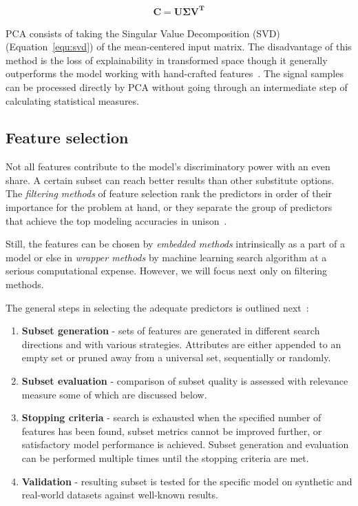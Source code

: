 \begin{ceqn}\begin{align}
\mathbf{C} = \mathbf{U \Sigma V^T}
\label{equ:svd}
\end{align}\end{ceqn}

PCA consists of taking the Singular Value Decomposition (SVD) (Equation~\ref{equ:svd}) of the mean-centered input matrix. The disadvantage of this method is the loss of explainability in transformed space though it generally outperforms the model working with hand-crafted features~\cite{brito_fault_2021}. The signal samples can be processed directly by PCA without going through an intermediate step of calculating statistical measures. 

\subsection{Feature selection}
Not all features contribute to the model's discriminatory power with an even share. A certain subset can reach better results than other substitute options. The \emph{filtering methods} of feature selection rank the predictors in order of their importance for the problem at hand, or they separate the group of predictors that achieve the top modeling accuracies in unison~\cite{johnson_feature_2019}.

Still, the features can be chosen by \emph{embedded methods} intrinsically as a part of a model or else in \emph{wrapper methods} by machine learning search algorithm at a serious computational expense. However, we will focus next only on filtering methods.

The general steps in selecting the adequate predictors is outlined next~\cite{nandi_condition_2019}:
\begin{enumerate}
    \itemsep0pt
    \item \textbf{Subset generation} - sets of features are generated in different search directions and with various strategies. Attributes are either appended to an empty set or pruned away from a universal set, sequentially or randomly.
    \item \textbf{Subset evaluation} - comparison of subset quality is assessed with relevance measure some of which are discussed below.
    \item \textbf{Stopping criteria} - search is exhausted when the specified number of features has been found, subset metrics cannot be improved further, or satisfactory model performance is achieved. Subset generation and evaluation can be performed multiple times until the stopping criteria are met.
    \item \textbf{Validation} - resulting subset is tested for the specific model on synthetic and real-world datasets against well-known results. 
\end{enumerate}

